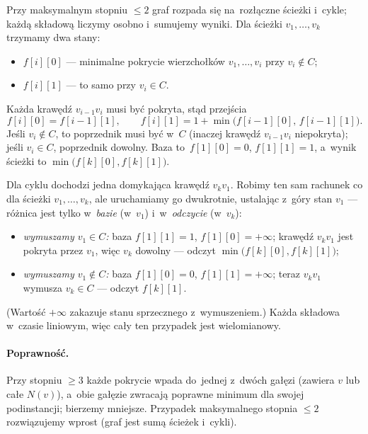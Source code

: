 \begin{dygresja}
 Przy maksymalnym stopniu $\le 2$ graf rozpada
	się na~rozłączne ścieżki i~cykle; każdą składową liczymy osobno i~sumujemy
	wyniki. Dla ścieżki $v_1,\dots,v_k$ trzymamy dwa stany:
	\begin{itemize}[nosep]
		\item $f[i][0]$ --- minimalne pokrycie wierzchołków $v_1,\dots,v_i$ przy
		      $v_i\notin C$;
		\item $f[i][1]$ --- to samo przy $v_i\in C$.
	\end{itemize}
	Każda krawędź $v_{i-1}v_i$ musi być pokryta, stąd przejścia
	\[
		f[i][0]=f[i-1][1],\qquad
		f[i][1]=1+\min\big(f[i-1][0],\,f[i-1][1]\big).
	\]
	Jeśli $v_i\notin C$, to poprzednik musi być w~$C$ (inaczej krawędź
	$v_{i-1}v_i$ niepokryta); jeśli $v_i\in C$, poprzednik dowolny. Baza
	to~$f[1][0]=0$, $f[1][1]=1$, a~wynik ścieżki to $\min\big(f[k][0],f[k][1]\big)$.

	Dla cyklu dochodzi jedna domykająca krawędź $v_k v_1$. Robimy ten sam
	rachunek co dla ścieżki $v_1,\dots,v_k$, ale uruchamiamy go dwukrotnie,
	ustalając z~góry stan $v_1$ --- różnica jest tylko w~\emph{bazie} (w~$v_1$)
	i~w~\emph{odczycie} (w~$v_k$):
	\begin{itemize}[nosep]
		\item \emph{wymuszamy $v_1\in C$:} baza $f[1][1]=1$, $f[1][0]=+\infty$;
		      krawędź $v_k v_1$ jest pokryta przez $v_1$, więc $v_k$ dowolny ---
		      odczyt $\min\big(f[k][0],f[k][1]\big)$;
		\item \emph{wymuszamy $v_1\notin C$:} baza $f[1][0]=0$, $f[1][1]=+\infty$;
		      teraz $v_k v_1$ wymusza $v_k\in C$ --- odczyt $f[k][1]$.
	\end{itemize}
	(Wartość $+\infty$ zakazuje stanu sprzecznego z~wymuszeniem.) Każda
	składowa w~czasie liniowym, więc cały ten przypadek jest wielomianowy.
\end{dygresja}

\paragraph{Poprawność.}
Przy stopniu $\ge 3$ każde pokrycie wpada do~jednej z~dwóch gałęzi (zawiera $v$
lub całe $N(v)$), a~obie gałęzie zwracają poprawne minimum dla swojej
podinstancji; bierzemy mniejsze. Przypadek maksymalnego stopnia $\le 2$
rozwiązujemy wprost (graf jest sumą ścieżek i~cykli).

